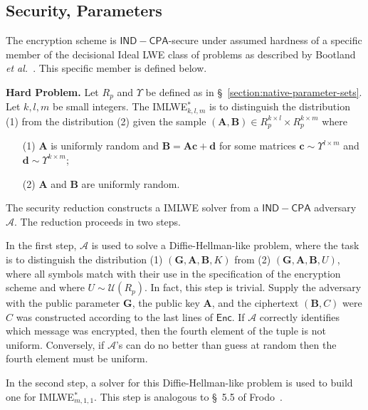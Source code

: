 \subsection{Security, Parameters}

The encryption scheme is $\mathsf{IND-CPA}$-secure under assumed hardness of a specific member of the decisional Ideal LWE class of problems as described by Bootland \emph{et al.}~\cite{BootlandCSV21}. This specific member is defined below.

\vspace{0.25cm}

\textbf{Hard Problem.} Let $R_p$ and $\Upsilon$ be defined as in \S~\ref{section:native-parameter-sets}. Let $k, l, m$ be small integers. The IMLWE$^*_{k,l,m}$ is to distinguish the distribution (1) from the distribution (2) given the sample $(\mathbf{A}, \mathbf{B}) \in R_p^{k \times l} \times R_p^{k \times m}$ where
\begin{itemize}
\item[(1)] $\mathbf{A}$ is uniformly random and $\mathbf{B} = \mathbf{A} \mathbf{c} + \mathbf{d}$ for some matrices $\mathbf{c} \sim \Upsilon^{l \times m}$ and $\mathbf{d} \sim \Upsilon^{k \times m}$;
\item[(2)] $\mathbf{A}$ and $\mathbf{B}$ are uniformly random.
\end{itemize}

\vspace{0.25cm}

The security reduction constructs a IMLWE solver from a $\mathsf{IND-CPA}$ adversary $\mathcal{A}$. The reduction proceeds in two steps.

In the first step, $\mathcal{A}$ is used to solve a Diffie-Hellman-like problem, where the task is to distinguish the distribution (1) $(\mathbf{G}, \mathbf{A}, \mathbf{B}, K)$ from (2) $(\mathbf{G}, \mathbf{A}, \mathbf{B}, U)$, where all symbols match with their use in the specification of the encryption scheme and where $U \sim \mathcal{U}(R_p)$. In fact, this step is trivial. Supply the adversary with the public parameter $\mathbf{G}$, the public key $\mathbf{A}$, and the ciphertext $(\mathbf{B}, C)$ were $C$ was constructed according to the last lines of $\mathsf{Enc}$. If $\mathcal{A}$ correctly identifies which message was encrypted, then the fourth element of the tuple is not uniform. Conversely, if $\mathcal{A}$'s can do no better than guess at random then the fourth element must be uniform.

In the second step, a solver for this Diffie-Hellman-like problem is used to build one for IMLWE$^*_{m, 1, 1}$. This step is analogous to \S~5.5 of Frodo~\cite{frodo}.

